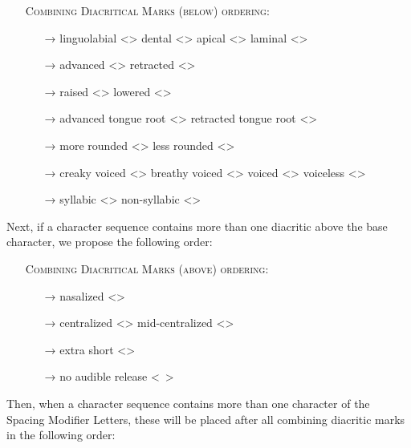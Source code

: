 \begin{itemize}
	\item[] \textsc{Combining Diacritical Marks (below) ordering:}
	\begin{itemize}	
	  \item[→] linguolabial <> \textbar{} dental <> \textbar{} apical <> \textbar{} laminal <>
	  \item[→] advanced <> \textbar{} retracted <> 
	  \item[→] raised <> \textbar{} lowered <>
	  \item[→] advanced tongue root <> \textbar{} retracted tongue root <>
	  \item[→] more rounded <> \textbar{} less rounded <>
	  \item[→] creaky voiced <> \textbar{} breathy voiced <> \textbar{} voiced <> \textbar{} voiceless <>
	  \item[→] syllabic <> \textbar{} non-syllabic <>
	\end{itemize}
 \end{itemize}

\noindent Next, if a character sequence contains more than one diacritic above the base
character, we propose the following order:

\begin{itemize}
	\item[] \textsc{Combining Diacritical Marks (above) ordering:}
	\begin{itemize}
	  \item[→] nasalized <>
	  \item[→] centralized <> \textbar{} mid-centralized <>
	  \item[→] extra short <>
	  \item[→] no audible release <\ >
 \end{itemize} \end{itemize}

\noindent Then, when a character sequence contains more than one character of the Spacing
Modifier Letters, these will be placed after all combining diacritic marks in the
following order:

